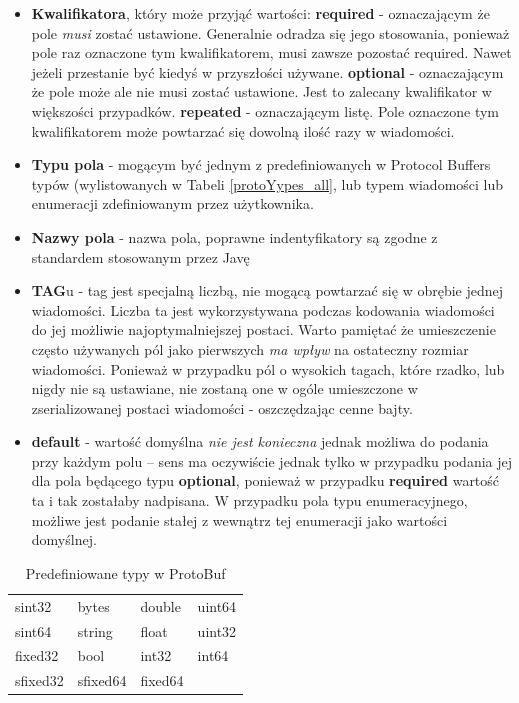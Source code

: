 \begin{itemize}
 \item \textbf{Kwalifikatora}, który może przyjąć wartości:
  \subitem \textbf{required} - oznaczającym że pole \textit{musi} zostać ustawione. Generalnie odradza się jego stosowania, ponieważ 
                               pole raz oznaczone tym kwalifikatorem, musi zawsze pozostać required. Nawet jeżeli przestanie być kiedyś w przyszłości używane.
  \subitem \textbf{optional} - oznaczającym że pole może ale nie musi zostać ustawione. Jest to zalecany kwalifikator w większości przypadków.
  \subitem \textbf{repeated} - oznaczającym listę. Pole oznaczone tym kwalifikatorem może powtarzać się dowolną ilość razy w wiadomości.
 \item \textbf{Typu pola} - mogącym być jednym z predefiniowanych w Protocol Buffers typów (wylistowanych w Tabeli \ref{protoYypes_all}, lub typem wiadomości lub enumeracji
                            zdefiniowanym przez użytkownika.
 \item \textbf{Nazwy pola} - nazwa pola, poprawne indentyfikatory są zgodne z standardem stosowanym przez Javę
 \item \textbf{TAG}u - tag jest specjalną liczbą, nie mogącą powtarzać się w obrębie jednej wiadomości. Liczba ta jest wykorzystywana podczas kodowania 
                       wiadomości do jej możliwie najoptymalniejszej postaci. Warto pamiętać że umieszczenie często używanych pól jako pierwszych \textit{ma wpływ}
                       na ostateczny rozmiar wiadomości. Ponieważ w przypadku pól o wysokich tagach, które rzadko, lub nigdy nie są ustawiane, nie zostaną one w ogóle 
                       umieszczone w zserializowanej postaci wiadomości - oszczędzając cenne bajty.
 \item \textbf{default} - wartość domyślna \textit{nie jest konieczna} jednak możliwa do podania przy każdym polu -- sens ma oczywiście jednak tylko w przypadku 
                          podania jej dla pola będącego typu \textbf{optional}, ponieważ w przypadku \textbf{required} wartość ta i tak zostałaby nadpisana.
                          W przypadku pola typu enumeracyjnego, możliwe jest podanie stałej z wewnątrz tej enumeracji jako wartości domyślnej.
\end{itemize}

\begin{table}
\begin{center}
\begin{tabular}{llll}
sint32 & bytes & double & uint64\\
sint64 & string & float & uint32\\
fixed32 & bool & int32 & int64 \\
sfixed32 & sfixed64 & fixed64 &  \\
\end{tabular}
\end{center}
\label{protoTupes_all}
\caption{Predefiniowane typy w ProtoBuf}
\end{table}

